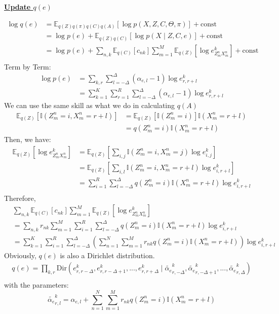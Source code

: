 \documentclass[12pt]{article}
\newenvironment{problem}[2][Problem]{\begin{trivlist}
\item[\hskip \labelsep {\bfseries #1}\hskip \labelsep {\bfseries #2.}]}{\end{trivlist}}
\begin{document}
\begin{problem}{2.8.24}
\begin{flushleft}
    \textbf{\underline{Update $q(e)$}}
\end{flushleft}
\begin{align*}
    \log q(e) &= \mathbb{E}_{q(Z)q(\pi)q(C)q(A)}[\log p(X, Z, C, \Theta, \pi)] + \text{const} \\
    &= \log p(e) + \mathbb{E}_{q(Z)q(C)}[\log p(X\mid Z, C, e)] + \text{const} \\
    &= \log p(e) 
        + \sum_{n,k}\mathbb{E}_{q(C)}[c_{nk}]\sum_{m=1}^{M}\mathbb{E}_{q(Z)}[\log e^k_{Z^n_{m}X^n_{m}}] 
        + \text{const} \\
\end{align*}
Term by Term:
\begin{align*}
    \log p(e) &= \sum_{k,r}\sum_{l=-\Delta}^{\Delta} (\alpha_{e,l} - 1)\log e^k_{r,r+l} \\
    &= \sum_{k=1}^{K}\sum_{r=1}^{R}\sum_{l=-\Delta}^{\Delta} (\alpha_{e,l} - 1)\log e^k_{r,r+l}
\end{align*}
We can use the same skill as what we do in calculating $q(A)$
\begin{align*}
    \mathbb{E}_{q(Z)}[\mathbb{I}(Z^n_{m}=i, X^n_{m}=r+l)] 
    &= \mathbb{E}_{q(Z)}[\mathbb{I}(Z^n_{m}=i)]\mathbb{I}(X^n_{m}=r+l) \\
    &= q(Z^n_{m}=i)\mathbb{I}(X^n_{m}=r+l)
\end{align*}
Then, we have:
\begin{align*}
    \mathbb{E}_{q(Z)}[\log e^k_{Z^n_{m}X^n_{m}}] 
    &= \mathbb{E}_{q(Z)}[\sum_{i,j}\mathbb{I}(Z^n_{m}=i, X^n_{m}=j)\log e^k_{i,j}] \\
    &= \mathbb{E}_{q(Z)}[\sum_{i,l}\mathbb{I}(Z^n_{m}=i, X^n_{m}=r+l)\log e^k_{i,r+l}] \\
    &= \sum_{i=1}^{R}\sum_{l=-\Delta}^{\Delta}q(Z^n_{m}=i)\mathbb{I}(X^n_{m}=r+l)\log e^k_{i,r+l} \\
\end{align*}
Therefore,
\begin{align*}
    &\sum_{n,k}\mathbb{E}_{q(C)}[c_{nk}]\sum_{m=1}^{M}\mathbb{E}_{q(Z)}[\log e^k_{Z^n_{m}X^n_{m}}]\\
    &= \sum_{n,k}r_{nk}\sum_{m=1}^{M}\sum_{i=1}^{R}\sum_{l=-\Delta}^{\Delta}q(Z^n_{m}=i)\mathbb{I}(X^n_{m}=r+l)\log e^k_{i,r+l} \\
    &= \sum_{k=1}^{K}\sum_{i=1}^{R}\sum_{l=-\Delta}^{\Delta}
        (\sum_{n=1}^{N}\sum_{m=1}^{M}r_{nk}q(Z^n_{m}=i)\mathbb{I}(X^n_{m}=r+l))\log e^k_{i,r+l}
\end{align*}
Obviously, $q(e)$ is also a Dirichlet distribution.
\begin{align*}
    q(e) = \prod_{k,r} \mathrm{Dir}(e^k_{r,r-\Delta}, e^k_{r,r-\Delta+1}, ..., e^k_{r,r+\Delta}
        \mid \tilde{\alpha_{e}}^k_{r,-\Delta},\tilde{\alpha_{e}}^k_{r,-\Delta+1},...,\tilde{\alpha_{e}}^k_{r,\Delta}) \\
\end{align*}
with the parameters:
\begin{equation}
    \tilde{\alpha_{e}}^k_{r,l} = \alpha_{e,l} + \sum_{n=1}^{N}\sum_{m=1}^{M}r_{nk} q(Z^n_{m}=i)\mathbb{I}(X^n_{m}=r+l)
\end{equation}


\end{problem}
\end{document}
